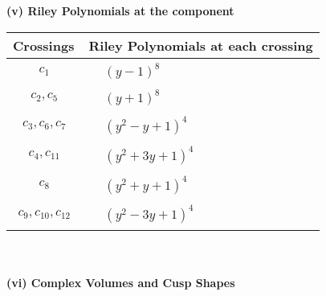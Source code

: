 \documentclass[1p]{elsarticle_modified}
\theoremstyle{definition}
\begin{document}
\newpage\renewcommand{\arraystretch}{1}
\flushleft \textbf{(v) Riley Polynomials at the component}\newline \\
\begin{tabular}{m{50pt}|m{274pt}}
Crossings & \hspace{64pt}Riley Polynomials at each crossing \\
\hline $$\begin{aligned}c_{1}\end{aligned}$$&$\begin{aligned}
&(y-1)^8
\end{aligned}$\\
\hline $$\begin{aligned}c_{2},c_{5}\end{aligned}$$&$\begin{aligned}
&(y+1)^8
\end{aligned}$\\
\hline $$\begin{aligned}c_{3},c_{6},c_{7}\end{aligned}$$&$\begin{aligned}
&(y^2- y+1)^4
\end{aligned}$\\
\hline $$\begin{aligned}c_{4},c_{11}\end{aligned}$$&$\begin{aligned}
&(y^2+3 y+1)^4
\end{aligned}$\\
\hline $$\begin{aligned}c_{8}\end{aligned}$$&$\begin{aligned}
&(y^2+y+1)^4
\end{aligned}$\\
\hline $$\begin{aligned}c_{9},c_{10},c_{12}\end{aligned}$$&$\begin{aligned}
&(y^2-3 y+1)^4
\end{aligned}$\\
\hline
\end{tabular}\\~\\
\newpage\flushleft \textbf{(vi) Complex Volumes and Cusp Shapes}
\end{document}
